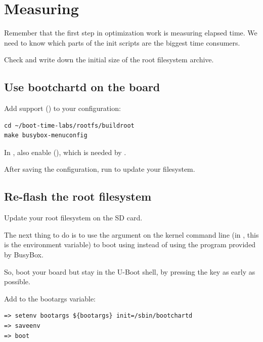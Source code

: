 
\section{Measuring}

Remember that the first step in optimization work is measuring elapsed
time. We need to know which parts of the init scripts are the biggest
time consumers.

Check and write down the initial size of the root filesystem archive.

\subsection{Use bootchartd on the board}

Add  support ()
to your  configuration:

\begin{verbatim}
cd ~/boot-time-labs/rootfs/buildroot
make busybox-menuconfig
\end{verbatim}

In , also enable  (), which is needed by
.

After saving the configuration, run  to update your filesystem.

\subsection{Re-flash the root filesystem}

Update your root filesystem on the SD card.

The next thing to do is to use the  argument on the
kernel command line (in , this is the 
environment variable) to boot using  instead of using
the  program provided by BusyBox.

So, boot your board but stay in the U-Boot shell, by pressing the
 key as early as possible.

Add  to the bootargs variable:
\begin{verbatim}
=> setenv bootargs ${bootargs} init=/sbin/bootchartd
=> saveenv
=> boot
\end{verbatim}

